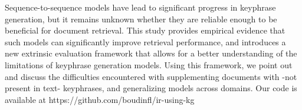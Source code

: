 Sequence-to-sequence models have lead to significant progress in keyphrase generation, but it remains unknown whether they are reliable enough to be beneficial for document retrieval. This study provides empirical evidence that such models can significantly improve retrieval performance, and introduces a new extrinsic evaluation framework that allows for a better understanding of the limitations of keyphrase generation models. Using this framework, we point out and discuss the difficulties encountered with supplementing documents with -not present in text- keyphrases, and generalizing models across domains. Our code is available at https://github.com/boudinfl/ir-using-kg
